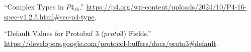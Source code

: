 \documentclass[11pt]{article}
\begin{document}
{{\begin{thebibliography}{45}
\mdbibitemlabel{{}[5]}\textquotedblleft{}Complex Types in $P4_{16}$.\textquotedblright{} \href{https://p4.org/wp-content/uploads/2024/10/P4-16-spec-v1.2.5.html\%23sec-p4-type}{{\ttfamily https://\hspace{0pt}p4.\hspace{0pt}org/\hspace{0pt}wp-\hspace{0pt}content/\hspace{0pt}uploads/\hspace{0pt}2024/\hspace{0pt}10/\hspace{0pt}P4-\hspace{0pt}16-\hspace{0pt}spec-\hspace{0pt}v1.\hspace{0pt}2.\hspace{0pt}5.\hspace{0pt}html\#\hspace{0pt}sec-\hspace{0pt}p4-\hspace{0pt}type}}.\label{p4complextypes}%

\mdbibitemlabel{{}[6]}\textquotedblleft{}Default Values for Protobuf 3 ($proto3$) Fields.\textquotedblright{} \href{https://developers.google.com/protocol-buffers/docs/proto3\%23default}{{\ttfamily https://\hspace{0pt}developers.\hspace{0pt}google.\hspace{0pt}com/\hspace{0pt}protocol-\hspace{0pt}buffers/\hspace{0pt}docs/\hspace{0pt}proto3\#\hspace{0pt}default}}.\label{protodefaults}%


\end{thebibliography}}}
\end{document}
